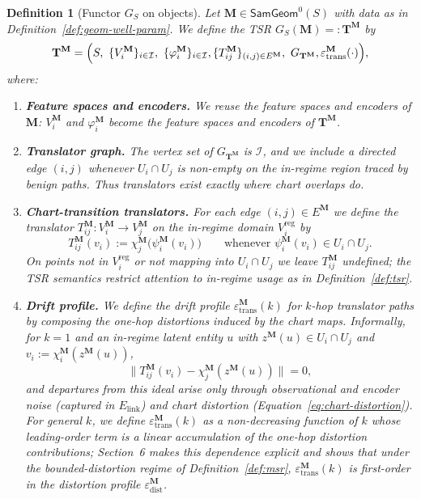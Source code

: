 \documentclass[11pt]{article}
\newtheorem{definition}{Definition}
\newcommand{\SamGeom}{\mathsf{SamGeom}}
\begin{document}
\begin{definition}[Functor $G_S$ on objects]
\label{def:G-on-objects}
Let $\mathbf{M} \in \SamGeom^0(S)$ with data as in
Definition~\ref{def:geom-well-param}. We define the TSR
$G_S(\mathbf{M}) =: \mathbf{T}^{\mathbf{M}}$ by
\[
\mathbf{T}^{\mathbf{M}}
=
\Bigl(
S,\ \{V_i^{\mathbf{M}}\}_{i\in\mathcal{I}},\ \{\varphi_i^{\mathbf{M}}\}_{i\in\mathcal{I}},
\{T_{ij}^{\mathbf{M}}\}_{(i,j)\in E^{\mathbf{M}}},\ G_{\mathbf{T}^{\mathbf{M}}},
\varepsilon_{\mathrm{trans}}^{\mathbf{M}}(\cdot)
\Bigr),
\]
where:
\begin{enumerate}[label=(\roman*),leftmargin=*]

\item \textbf{Feature spaces and encoders.}
We reuse the feature spaces and encoders of $\mathbf{M}$:
$V_i^{\mathbf{M}}$ and $\varphi_i^{\mathbf{M}}$ become the feature spaces and
encoders of $\mathbf{T}^{\mathbf{M}}$.

\item \textbf{Translator graph.}
The vertex set of $G_{\mathbf{T}^{\mathbf{M}}}$ is $\mathcal{I}$, and we include
a directed edge $(i,j)$ whenever $U_i \cap U_j$ is non-empty on the in-regime
region traced by benign paths. Thus translators exist exactly where chart
overlaps do.

\item \textbf{Chart-transition translators.}
For each edge $(i,j) \in E^{\mathbf{M}}$ we define the translator
$T_{ij}^{\mathbf{M}} : V_i^{\mathbf{M}} \to V_j^{\mathbf{M}}$ on the in-regime
domain $V_i^{\mathrm{reg}}$ by
\begin{equation}
\label{eq:chart-translator}
T_{ij}^{\mathbf{M}}(v_i)
:=
\chi_j^{\mathbf{M}}\bigl(\psi_i^{\mathbf{M}}(v_i)\bigr)
\qquad
\text{whenever }\psi_i^{\mathbf{M}}(v_i) \in U_i \cap U_j.
\end{equation}
On points not in $V_i^{\mathrm{reg}}$ or not mapping into $U_i \cap U_j$ we
leave $T_{ij}^{\mathbf{M}}$ undefined; the TSR semantics restrict attention
to in-regime usage as in Definition~\ref{def:tsr}.

\item \textbf{Drift profile.}
We define the drift profile $\varepsilon_{\mathrm{trans}}^{\mathbf{M}}(k)$
for $k$-hop translator paths by composing the one-hop distortions induced by
the chart maps. Informally, for $k=1$ and an in-regime latent entity $u$ with
$z^{\mathbf{M}}(u) \in U_i \cap U_j$ and
$v_i := \chi_i^{\mathbf{M}}(z^{\mathbf{M}}(u))$,
\[
\bigl\|
T_{ij}^{\mathbf{M}}(v_i)
-
\chi_j^{\mathbf{M}}(z^{\mathbf{M}}(u))
\bigr\|
=
0,
\]
and departures from this ideal arise only through observational and encoder
noise (captured in $E_{\mathrm{link}}$) and chart distortion
(Equation~\eqref{eq:chart-distortion}). For general $k$, we define
$\varepsilon_{\mathrm{trans}}^{\mathbf{M}}(k)$ as a non-decreasing function
of $k$ whose leading-order term is a linear accumulation of the one-hop
distortion contributions; Section~6 makes this dependence explicit and shows
that under the bounded-distortion regime of Definition~\ref{def:msr},
$\varepsilon_{\mathrm{trans}}^{\mathbf{M}}(k)$ is first-order in the
distortion profile $\varepsilon_{\mathrm{dist}}^{\mathbf{M}}$.


\end{enumerate}
\end{definition}
\end{document}
